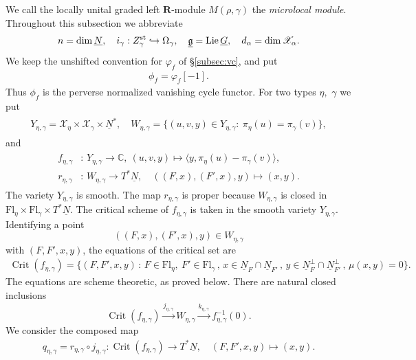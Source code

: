 \documentclass[11pt,reqno]{amsart}
\theoremstyle{definition}
\theoremstyle{remark}
\def\dN{\underline N}
\def\dG{\underline G}
\def\dg{\underline{\mathfrak g}}
\def\scrX{\mathscr X}
\def\Fl{\mathrm{Fl}}
\def\bR{\mathbf R}
\begin{document}
We call the locally unital graded left $\bR$-module $M(\rho,\gamma)$ the \emph{microlocal module}.
Throughout this subsection we abbreviate
\begin{align}\label{abv1}
n=\dim\dN,\quad
 i_\gamma:Z^{\rm st}_\gamma\hookrightarrow\Omega_\gamma,\quad
 \dg=\operatorname{Lie}\dG,\quad
 d_\alpha=\dim\scrX_\alpha.
\end{align}
We keep the unshifted convention for $\varphi_f$ of
\S\ref{subsec:vc}, and put
\begin{align}\label{phiphi} \phi_f=\varphi_f[-1].\end{align}
Thus $\phi_f$ is the perverse normalized vanishing cycle functor.
For two types $\eta,$ $\gamma$ we put
\begin{align}\label{YW}
\begin{split}
Y_{\eta,\gamma} =\scrX_\eta\times\scrX_\gamma\times \dN^*
,\quad
 W_{\eta,\gamma}=\{(u,v,y)\in Y_{\eta,\gamma}:\ \pi_\eta(u)=\pi_\gamma(v)\},
   \end{split}
\end{align}
and
\begin{align}\label{FEG}
\begin{split}
  f_{\eta,\gamma}&: \, Y_{\eta,\gamma} \to\mathbb C ,\ 
 (u,v,y)\mapsto\langle y,\pi_\eta(u)-\pi_\gamma(v)\rangle,\\
  r_{\eta,\gamma}&:\,W_{\eta,\gamma}\longrightarrow T^*\dN,
  \quad ((F,x),(F',x),y)\longmapsto(x,y).
 \end{split}
\end{align}
The variety $Y_{\eta,\gamma}$ is smooth.
The map $r_{\eta,\gamma}$ is proper because $W_{\eta,\gamma}$ is closed in
$\Fl_\eta\times\Fl_\gamma\times T^*\dN$.
The critical scheme of $f_{\eta,\gamma}$ is taken in the smooth variety $Y_{\eta,\gamma}$. 
Identifying a point
$$((F,x),(F',x),y)\in W_{\eta,\gamma}$$ with $(F,F',x,y)$, the  equations of the critical set are
\[
\begin{aligned}
\operatorname{Crit}(f_{\eta,\gamma})=\bigl\{(F,F',x,y)\,:\,
 F\in\Fl_\eta,\ F'\in\Fl_\gamma\,,\,
 x\in\dN_F\cap\dN_{F'}\,,\,
 y\in\dN_F^\perp\cap\dN_{F'}^\perp\,,\,
 \mu(x,y)=0\bigr\}.
\end{aligned}
\]
The equations are scheme theoretic, as proved below.
There are natural closed inclusions
\[
\operatorname{Crit}(f_{\eta,\gamma})
\xrightarrow{j_{\eta,\gamma}}W_{\eta,\gamma}
\xrightarrow{k_{\eta,\gamma}} f_{\eta,\gamma}^{-1}(0).
\]
We consider the composed map
\begin{align}\label{QEG}q_{\eta,\gamma}=r_{\eta,\gamma}\circ j_{\eta,\gamma}:\operatorname{Crit}(f_{\eta,\gamma})\longrightarrow T^*\dN,
  \quad (F,F',x,y)\longmapsto(x,y).
\end{align}
\end{document}
